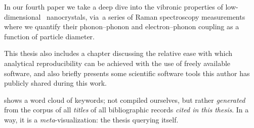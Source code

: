 \documentclass[webedition,openright,titles,swedish,english]{LuaUUThesis}\usepackage[]{graphicx}\usepackage[]{xcolor}
\newcommand{\via}{via}
\begin{document}
In our fourth paper
we take a deep dive into the vibronic properties of low-dimensional \ZnO\ nanocrystals,
\via\ a series of Raman spectroscopy measurements where we quantify
their phonon--phonon and electron--phonon coupling as a function of particle diameter.


This thesis also includes a chapter discussing the relative ease with which
analytical reproducibility can be achieved with the use of freely available software,
and also briefly presents some scientific software tools
this author has publicly shared during this work.


 shows a word cloud of keywords;
not compiled ourselves, but rather \emph{generated}
from the corpus of all \emph{titles} of all bibliographic records
\emph{cited in this thesis}.
In a way, it is a \emph{meta}-visualization: the thesis querying itself.

%

%



%
\end{document}
